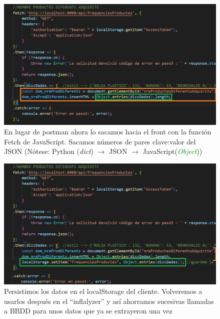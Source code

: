 \documentclass{beamer}
\begin{document}
	

		\begin{frame}
	
			\begin{figure}
				\centering
				\includegraphics[width=.9\linewidth]{imgEspecifiques/dashboardB}
				\caption{En lugar de postman ahora lo sacamos hacia el front con la función Fetch de JavaScript. Sacamos números de pares clave:valor del JSON (Nótese: Python (\textit{dict}) $\rightarrow$ JSON $\rightarrow$ JavaScript(\textit{\textcolor{green}{Object}}))}
				\label{fig:dashboardB}
			\end{figure}
			
		\end{frame}
		
		
		\begin{frame}
			
			\begin{figure}
				\centering
				\includegraphics[width=.9\linewidth]{imgEspecifiques/dashboardC}
				\caption{Persistimos los datos en el localStorage del cliente. Volveremos a usarlos después en el ``inflalyzer'' y así ahorramos sucesivas llamadas a BBDD para unos datos que ya se extrayeron una vez}
				\label{fig:dashboardC}
			\end{figure}
			
		\end{frame}
		
\end{document}
